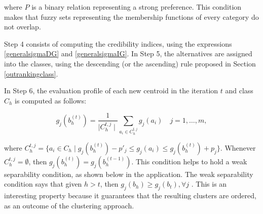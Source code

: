 \documentclass[]{elsarticle}
\theoremstyle{definition}
\begin{document}
\noindent
where $P$ is a binary relation representing a strong preference.  This condition makes that fuzzy sets representing the membership functions of every category do not overlap. 


Step 4 consists of computing the credibility indices, using the expressions \eqref{generalsigmaDG} and  \eqref{generalsigmaIG}. In Step 5, the alternatives are assigned into the classes, using the descending (or the ascending) rule proposed in Section \ref{outrankingclass}.

In Step 6, the evaluation profile of each new centroid in the iteration $t$ and class $C_h$ is computed as follows:

\begin{equation}
g_j(b_h^{(t)}) = \frac{1}{\mid C_h^{t,j} \mid} \sum_{a_i \in C_h^{t,j}} g_j(a_i) \quad j=1,\ldots,m,\label{newcentroid}
\end{equation}

\noindent
{\color{red}where $C_h^{t,j}=\{a_i \in C_h \mid g_j(b_h^{(t)})-p'_j\leq g_j(a_i) \leq g_j(b_h^{(t)})+p_j\}$.  Whenever $C_h^{t,j}=\emptyset$, then $g_j(b_h^{(t)})=g_j(b_h^{(t-1)})$.   This condition helps to hold a weak separability condition, as shown below in the application. The weak separability condition says that given $h > t$, then $g_j(b_h) \geq g_j(b_t), \forall j$ \citep{roy2012}. This is an interesting property because it guarantees that the resulting clusters are ordered, as an outcome of the clustering approach.
}
\end{document}
